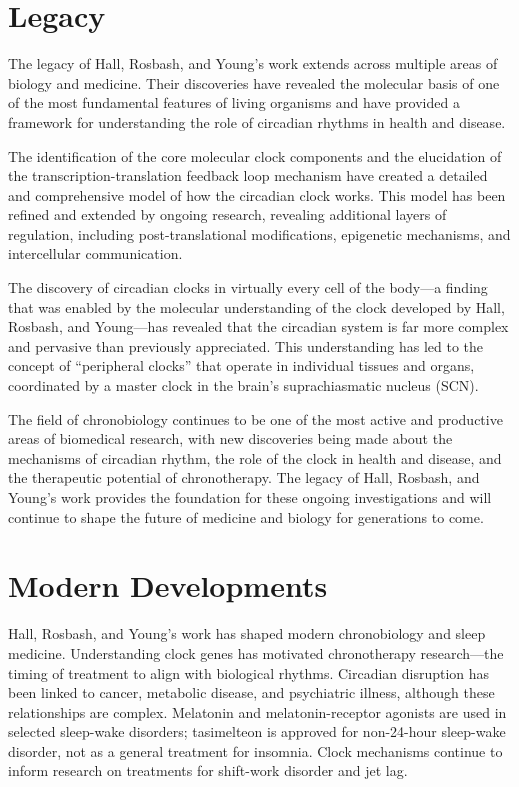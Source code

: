 \section{Legacy}

The legacy of Hall, Rosbash, and Young's work extends across multiple areas of biology and medicine. Their discoveries have revealed the molecular basis of one of the most fundamental features of living organisms and have provided a framework for understanding the role of circadian rhythms in health and disease.

The identification of the core molecular clock components and the elucidation of the transcription-translation feedback loop mechanism have created a detailed and comprehensive model of how the circadian clock works. This model has been refined and extended by ongoing research, revealing additional layers of regulation, including post-translational modifications, epigenetic mechanisms, and intercellular communication.

The discovery of circadian clocks in virtually every cell of the body---a finding that was enabled by the molecular understanding of the clock developed by Hall, Rosbash, and Young---has revealed that the circadian system is far more complex and pervasive than previously appreciated. This understanding has led to the concept of ``peripheral clocks'' that operate in individual tissues and organs, coordinated by a master clock in the brain's suprachiasmatic nucleus (SCN).

The field of chronobiology continues to be one of the most active and productive areas of biomedical research, with new discoveries being made about the mechanisms of circadian rhythm, the role of the clock in health and disease, and the therapeutic potential of chronotherapy. The legacy of Hall, Rosbash, and Young's work provides the foundation for these ongoing investigations and will continue to shape the future of medicine and biology for generations to come.


\section{Modern Developments}

Hall, Rosbash, and Young's work has shaped modern chronobiology and sleep medicine. Understanding clock genes has motivated chronotherapy research---the timing of treatment to align with biological rhythms. Circadian disruption has been linked to cancer, metabolic disease, and psychiatric illness, although these relationships are complex. Melatonin and melatonin-receptor agonists are used in selected sleep-wake disorders; tasimelteon is approved for non-24-hour sleep-wake disorder, not as a general treatment for insomnia. Clock mechanisms continue to inform research on treatments for shift-work disorder and jet lag.


